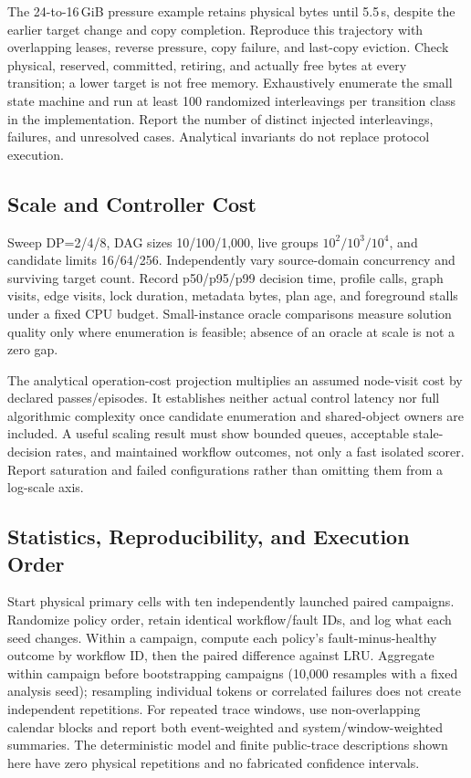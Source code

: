 \documentclass[sigplan,10pt,anonymous,nonacm]{acmart}
\begin{document}
The 24-to-16\,GiB pressure example retains physical bytes until 5.5\,s,
despite the earlier target change and copy completion. Reproduce this
trajectory with overlapping leases, reverse pressure, copy failure,
and last-copy eviction. Check physical, reserved, committed, retiring,
and actually free bytes at every transition; a lower target is not free
memory. Exhaustively enumerate the small state machine and run at least
100 randomized interleavings per transition class in the implementation.
Report the number of distinct injected interleavings, failures, and
unresolved cases. Analytical invariants do not replace protocol execution.

\FloatBarrier
\subsection{Scale and Controller Cost}

Sweep DP=2/4/8, DAG sizes 10/100/1,000, live groups
$10^2/10^3/10^4$, and candidate limits 16/64/256. Independently vary
source-domain concurrency and surviving target count. Record p50/p95/p99
decision time, profile calls, graph visits, edge visits, lock duration,
metadata bytes, plan age, and foreground stalls under a fixed CPU budget.
Small-instance oracle comparisons measure solution quality only where
enumeration is feasible; absence of an oracle at scale is not a zero gap.

The analytical operation-cost projection multiplies an assumed node-visit cost by declared passes/episodes. It establishes neither actual control latency nor full
algorithmic complexity once candidate enumeration and shared-object
owners are included. A useful scaling result must show bounded queues,
acceptable stale-decision rates, and maintained workflow outcomes, not
only a fast isolated scorer. Report saturation and failed configurations
rather than omitting them from a log-scale axis.

\FloatBarrier
\subsection{Statistics, Reproducibility, and Execution Order}
\label{sec:eval-plan}

Start physical primary cells with ten independently launched paired
campaigns. Randomize policy order, retain identical workflow/fault IDs,
and log what each seed changes. Within a campaign, compute each policy's
fault-minus-healthy outcome by workflow ID, then the paired difference
against LRU. Aggregate within campaign before bootstrapping campaigns
(10,000 resamples with a fixed analysis seed); resampling individual
tokens or correlated failures does not create independent repetitions.
For repeated trace windows, use non-overlapping calendar blocks and
report both event-weighted and system/window-weighted summaries.
The deterministic model and finite public-trace descriptions shown here
have zero physical repetitions and no fabricated confidence intervals.
\end{document}
